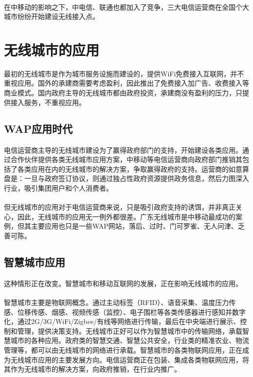 \documentclass[a4paper,14pt,openany]{article}
\begin{document}
\paragraph{}
在中移动的影响之下，中电信、联通也都加入了竞争，三大电信运营商在全国个大城市纷纷开始建设无线接入点。

\newpage
\section{无线城市的应用}
\paragraph{}
最初的无线城市是作为城市服务设施而建设的，提供WiFi免费接入互联网，并不重视应用。国外的承建商需要考虑盈利，因此推出了免费接入加广告、收费接入等商业模式。国内政府主导的无线城市都由政府投资，承建商没有盈利的压力，只提供接入服务，不重视应用。
\subsection{WAP应用时代}
\paragraph{}
电信运营商主导的无线城市建设为了赢得政府部门的支持，开始建设各类应用。通过合作伙伴提供各类无线城市应用方案，中移动等电信运营商向政府部门推销其包括了各类应用在内的无线城市的解决方案，争取赢得政府的支持。运营商的如意算盘是：一旦与政府签订协议，则通过独占性政府资源提供政务信息，然后力图深入行业，吸引集团用户和个人消费者。
\paragraph{}
但无线城市的应用对于电信运营商来说，只是吸引政府支持的诱饵，并非真正关心，因此，无线城市的应用无一例外都很差。广东无线城市是中移动最成功的案例，但其主要应用也只是一些WAP网站，落后、过时、门可罗雀、无人问津、乏善可陈。

\subsection{智慧城市应用}
\paragraph{}
这种情形正在改变。智慧城市和移动互联网的发展，正在影响无线城市的应用。
\paragraph{}
智慧城市主要是物联网概念。通过主动标签（RFID）、语音采集、温度压力传感、位移传感、烟感、视频传感（监控）、电子围栏等各类传感器进行感知并数字化，通过2G/3G/WiFi/Zigbee/有线等网络进行传输，最后在中央端进行展示、控制和管理，提供决策支持。无线城市正好可以作为智慧城市中的传输网络，承载智慧城市的各种应用。政府类的智慧交通、智慧公共安全，行业类的精准农业、物流管理等，都可以由无线城市的网络进行承载。智慧城市的各类物联网应用，正在成为无线城市应用的主要发展方向。电信运营商正在包装、集成各类物联网应用，将其作为无线城市的解决方案，向政府推销，在行业内推广。
\end{document}
